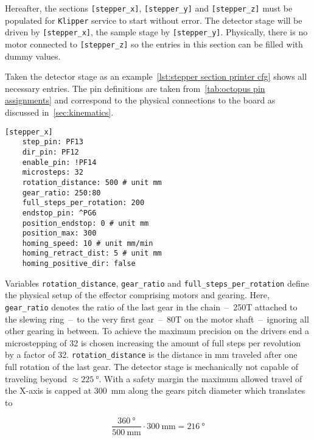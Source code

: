         Hereafter, the sections \texttt{[stepper\_x]}, \texttt{[stepper\_y]} and \texttt{[stepper\_z]} must be populated for \texttt{Klipper} service to start without error.
        The detector stage will be driven by \texttt{[stepper\_x]}, the sample stage by \texttt{[stepper\_y]}.
        Physically, there is no motor connected to \texttt{[stepper\_z]} so the entries in this section can be filled with dummy values.

        Taken the detector stage as an example~\cref{lst:stepper section printer cfg} shows all necessary entries.
        The pin definitions are taken from~\cref{tab:octopus pin assignments} and correspond to the physical connections to the board as discussed in~\cref{sec:kinematics}.

        \begin{lstlisting}[style=mydjango, firstnumber=16,
            caption={[Example stepper section of \texttt{printer.cfg}]Example stepper section of \texttt{printer.cfg}.},
            label={lst:stepper section printer cfg}%
            ]
    [stepper_x]
    step_pin: PF13
    dir_pin: PF12
    enable_pin: !PF14
    microsteps: 32
    rotation_distance: 500 # unit mm
    gear_ratio: 250:80
    full_steps_per_rotation: 200
    endstop_pin: ^PG6
    position_endstop: 0 # unit mm
    position_max: 300
    homing_speed: 10 # unit mm/min
    homing_retract_dist: 5 # unit mm
    homing_positive_dir: false
        \end{lstlisting}

        Variables \texttt{rotation\_distance}, \texttt{gear\_ratio} and \texttt{full\_steps\_per\_rotation} define the physical setup of the effector comprising motors and gearing.
        Here, \texttt{gear\_ratio} denotes the ratio of the last gear in the chain~--~250T attached to the slewing ring~--~to the very first gear~--~80T on the motor shaft~--~ignoring all other gearing in between.
        To achieve the maximum precision on the drivers end a microstepping of 32 is chosen increasing the amount of full steps per revolution by a factor of 32.
        \texttt{rotation\_distance} is the distance in \unit{\milli\meter} traveled after one full rotation of the last gear.
        The detector stage is mechanically not capable of traveling beyond \(\approx \qty{225}{\degree}\).
        With a safety margin the maximum allowed travel of the X-axis is capped at \qty{300}{\milli\metre} along the gears pitch diameter which translates to

        \begin{equation}
            \frac{\qty{360}{\degree}}{\qty{500}{\milli\metre}} \cdot \qty{300}{\milli\metre} = \qty{216}{\degree}
            \label{eq:position max}
        \end{equation}
        
